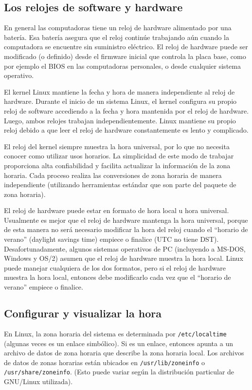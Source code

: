 \documentclass[12pt]{article}
\begin{document}
\subsection*{ Los relojes de software y hardware}


En general las computadoras tiene un reloj de hardware alimentado por una batería.
Esa batería asegura que el reloj continúe trabajando aún cuando la computadora se encuentre sin
suministro eléctrico. El reloj de hardware puede ser modificado (o definido)
desde el firmware inicial que controla la placa base, como por ejemplo el BIOS en las 
computadoras personales, o desde cualquier sistema operativo.

El kernel Linux mantiene la fecha y hora de manera independiente al reloj de hardware.
Durante el inicio de un sistema Linux, el kernel configura su propio reloj de software accediendo
a la fecha y hora mantenida por el reloj de hardware.
Luego, ambos relojes trabajan independientemente.
Linux mantiene su propio reloj debido a que leer el reloj de hardware constantemente es 
lento y complicado.

El reloj del kernel siempre muestra la hora universal, por lo que
no necesita conocer como utilizar usos horarios. La simplicidad de este
modo de trabajar proporciona alta confiabilidad y facilita actualizar 
la información de la zona horaria. Cada proceso realiza las conversiones de zona horaria 
de manera independiente (utilizando herramientas estándar que son parte del paquete de zona horaria).


El reloj de hardware puede estar en formato de hora local u hora universal.
Usualmente es mejor que el reloj de hardware mantenga la hora universal,
porque de esta manera no será necesario modificar la hora del reloj cuando el ``horario de verano''
(daylight savings time) empiece o finalice (UTC no tiene DST). Desafortunadamente, algunos sistemas operativos de PC
(incluyendo a MS-DOS, Windows y OS/2) asumen que el reloj de hardware muestra la hora local.
Linux puede manejar cualquiera de los dos formatos, pero si el reloj de hardware muestra la hora local,
entonces debe modificarlo cada vez que el ``horario de verano'' empiece o finalice.


\subsection*{Configurar y visualizar la hora}


En Linux, la zona horaria del sistema es determinada por \texttt{/etc/localtime} (algunas veces
es un enlace simbólico). Si es un enlace, entonces apunta a un archivo de datos de zona horaria
que describe la zona horaria local. Los archivos de datos de zonas horarias están ubicados en
\texttt{/usr/lib/zoneinfo} o \texttt{/usr/share/zoneinfo}. (Esto puede variar según la 
distribución particular de GNU/Linux utilizada). 
\end{document}
